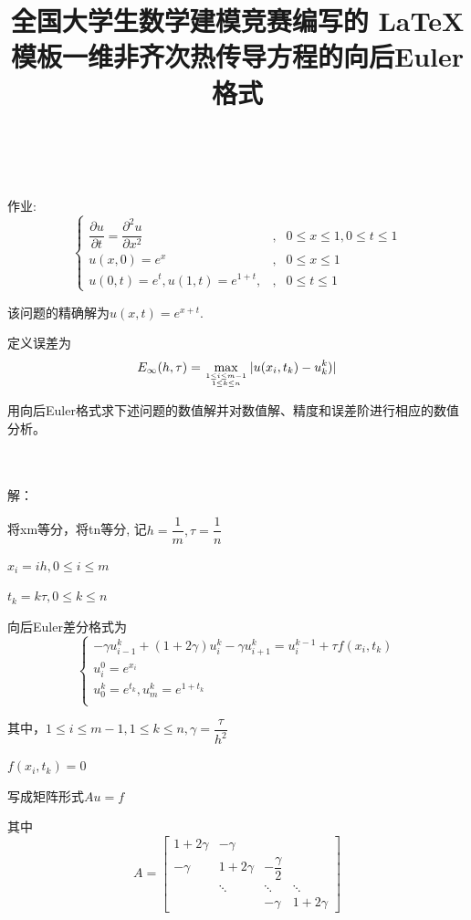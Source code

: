 \documentclass[withoutpreface,bwprint]{cumcmthesis} %
\title{全国大学生数学建模竞赛编写的 \LaTeX{} 模板}
\title{一维非齐次热传导方程的向后Euler格式}
\begin{document}
	\maketitle
	~\\
	~\\
	
	作业:
	$$
	\left\{
	\begin{array}{lcl}
	\dfrac{\partial{u}}{\partial{t}}=\dfrac{\partial^{2}{u}}{\partial{x}^{2}} &,&0 \leq x \leq 1,0 \leq t \leq 1 \\
	
	u(x,0)=e^x &, & 0 \leq x \leq 1 \\
	
	u(0,t)=e^t,u(1,t)=e^{1+t},&, &0 \leq t \leq 1
	\end{array}
	\right.
	$$
	
	

	
	
	该问题的精确解为$ u(x,t)=e^{x+t}$.
	
	定义误差为$$ E_{\infty}(h,\tau)=\max \limits_{1 \leq i \leq m-1 \atop 1 \leq k \leq n } |u(x_{i},t_{k})-u_{k}^k)| $$
	
	用向后Euler格式求下述问题的数值解并对数值解、精度和误差阶进行相应的数值分析。

	
	~\\
	~\\
	
	解：
	
	将xm等分，将tn等分, 记$h=\dfrac{1}{m},\tau=\dfrac{1}{n}$

	$x_i=ih,0 \leq i \leq m$
	
	$t_k=k \tau,0 \leq k \leq n$
	
	向后Euler差分格式为
	$$
	\left\{
	\begin{array}{lcl}
	-\gamma u_{i-1}^k+(1+2 \gamma) u_i^k- \gamma u_{i+1}^k=u_i^{k-1}+\tau f(x_i,t_k) \\
	u_i^0=e^{x_{i}} \\
	u_0^k=e^{t_k},u_m^k=e^{1+t_k} \\
	\end{array}
	\right.
	$$
	
	其中，$1 \leq i \leq m-1,1 \leq k \leq n,\gamma=\dfrac{\tau}{h^2}$
	
	$f(x_i,t_k)=0$
	

    
	写成矩阵形式$Au=f$
	
	其中
	$$
	A=
	\begin{bmatrix}
	1+2\gamma & -\gamma \\
	-\gamma & 1+2\gamma & -\dfrac{\gamma}{2} \\
	& \ddots & \ddots & \ddots \\
	 & & 	-\gamma & 1+2\gamma
	\end{bmatrix}
	$$
	
\end{document}
